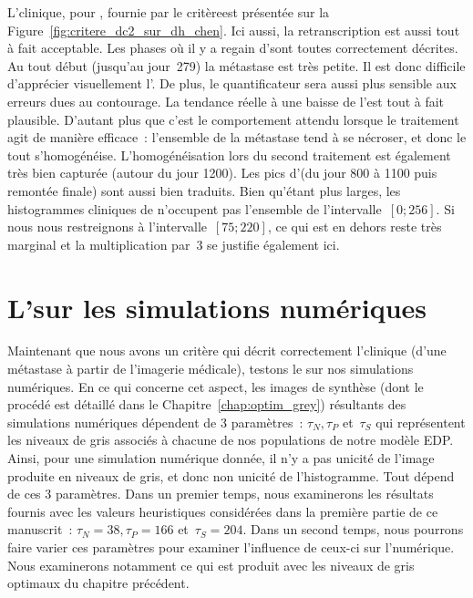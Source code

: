 \documentclass[main.tex]{subfiles}
\begin{document}
L'\hetero clinique, pour \Chen, fournie par le critère\HH est présentée sur la Figure~\ref{fig:critere_dc2_sur_dh_chen}. Ici aussi, la retranscription est aussi tout à fait acceptable. Les phases où il y a regain d'\hetero sont toutes correctement décrites. Au tout début (jusqu'au jour~279) la métastase est très petite. Il est donc difficile d'apprécier visuellement l'\hetero. De plus, le quantificateur sera aussi plus sensible aux erreurs dues au contourage. La tendance réelle à une baisse de l'\hetero est tout à fait plausible. D'autant plus que c'est le comportement attendu lorsque le traitement agit de manière efficace~: l'ensemble de la métastase tend à se nécroser, et donc le tout s'homogénéise. 
L'homogénéisation lors du second traitement est également très bien capturée (autour du jour 1200). 
Les pics d'\hetero (du jour 800 à 1100 puis remontée finale) sont aussi bien traduits. 
Bien qu'étant plus larges, les histogrammes cliniques de \Chen n'occupent pas l'ensemble de l'intervalle~$[0;256]$. Si nous nous restreignons à l'intervalle~$[75;220]$, ce qui est en dehors reste très marginal et la multiplication par~3 se justifie également ici. 


\section{L'\hetero sur les simulations numériques}

Maintenant que nous avons un critère qui décrit correctement l'\hetero clinique (d'une métastase à partir de l'imagerie médicale), testons le %
sur nos simulations numériques. 
En ce qui concerne cet aspect, les images de synthèse (dont le procédé est détaillé dans le Chapitre~\ref{chap:optim_grey}) résultants des simulations numériques dépendent de 3 paramètres~: $\tau_N, \tau_P$ et~$\tau_S$ qui représentent les niveaux de gris associés à chacune de nos populations de notre modèle EDP. Ainsi, pour une simulation numérique donnée, il n'y a pas unicité de l'image produite en niveaux de gris, et donc non unicité de l'histogramme. Tout dépend de ces 3 paramètres. 
Dans un premier temps, nous examinerons %
les résultats fournis 
avec les valeurs heuristiques considérées  dans la première partie de ce manuscrit~: $\tau_N=38, \tau_P=166$ et~$\tau_S=204$. 
Dans un second temps, nous pourrons faire varier ces paramètres pour examiner l'influence de ceux-ci sur l'\hetero numérique. Nous examinerons notamment ce qui est produit avec les niveaux de gris optimaux du chapitre précédent. 
\end{document}
